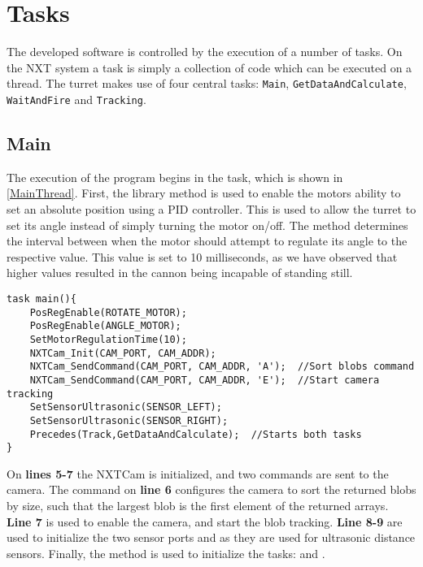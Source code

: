 \section{Tasks}
The developed software is controlled by the execution of a number of
tasks. On the NXT system a task is simply a collection of code which can be
executed on a thread. The turret makes use of four central tasks:
\texttt{Main}, \texttt{GetDataAndCalculate}, \texttt{WaitAndFire} and
\texttt{Tracking}.

\subsection{Main}
The execution of the program begins in the  task, which is shown
in \autoref{MainThread}. First, the library method
 is used to enable the motors ability to set
an absolute position using a PID controller. This is used to allow the turret to
set its angle instead of simply turning the motor on/off.
The  method determines the interval between when
the motor should attempt to regulate its angle to the respective value. This
value is set to 10 milliseconds, as we have observed that higher values resulted
in the cannon being incapable of standing still.\nl

\begin{minipage}[H]{\linewidth}
\begin{lstlisting}[caption = Entry point for the program execution., label = MainThread] 
task main(){
    PosRegEnable(ROTATE_MOTOR);
    PosRegEnable(ANGLE_MOTOR);
    SetMotorRegulationTime(10);
    NXTCam_Init(CAM_PORT, CAM_ADDR);
    NXTCam_SendCommand(CAM_PORT, CAM_ADDR, 'A');  //Sort blobs command
    NXTCam_SendCommand(CAM_PORT, CAM_ADDR, 'E');  //Start camera tracking
    SetSensorUltrasonic(SENSOR_LEFT);
    SetSensorUltrasonic(SENSOR_RIGHT);
    Precedes(Track,GetDataAndCalculate);  //Starts both tasks
}
\end{lstlisting}
\end{minipage}

On \textbf{lines 5-7} the NXTCam is initialized, and two commands are
sent to the camera. The command on \textbf{line 6} configures the camera
to sort the returned blobs by size, such that the largest blob is the first
element of the returned arrays. \textbf{Line 7} is used to enable the camera,
and start the blob tracking. \textbf{Line 8-9} are used to
initialize the two sensor ports  and
 as they are used for ultrasonic distance sensors.
Finally, the  method is used to initialize the
tasks:  and .
